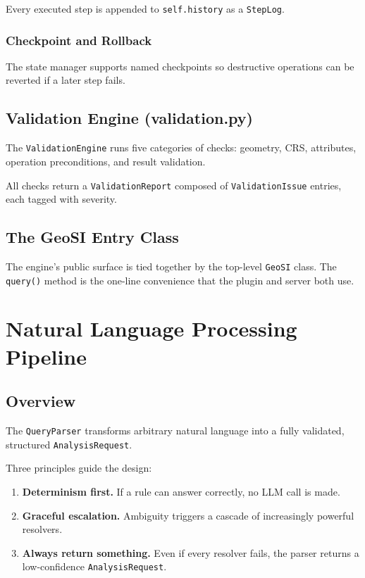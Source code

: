 \documentclass[12pt,a4paper]{report}
\begin{document}
Every executed step is appended to \texttt{self.history} as a \texttt{StepLog}.

\subsection{Checkpoint and Rollback}

The state manager supports named checkpoints so destructive operations can be reverted if a later step fails.

\section{Validation Engine (validation.py)}

The \texttt{ValidationEngine} runs five categories of checks: geometry, CRS, attributes, operation preconditions, and result validation.

All checks return a \texttt{ValidationReport} composed of \texttt{ValidationIssue} entries, each tagged with severity.

\section{The GeoSI Entry Class}

The engine's public surface is tied together by the top-level \texttt{GeoSI} class.  The \texttt{query()} method is the one-line convenience that the plugin and server both use.

\chapter{Natural Language Processing Pipeline}

\section{Overview}

The \texttt{QueryParser} transforms arbitrary natural language into a fully validated, structured \texttt{AnalysisRequest}.

Three principles guide the design:

\begin{enumerate}
  \item \textbf{Determinism first.}  If a rule can answer correctly, no LLM call is made.
  \item \textbf{Graceful escalation.}  Ambiguity triggers a cascade of increasingly powerful resolvers.
  \item \textbf{Always return something.}  Even if every resolver fails, the parser returns a low-confidence \texttt{AnalysisRequest}.
\end{enumerate}
\end{document}
